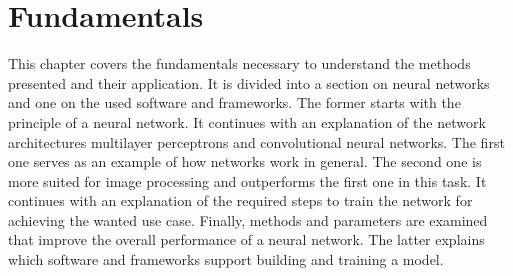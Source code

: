 \chapter{Fundamentals}
\label{sec:fundamentals}
This chapter covers the fundamentals necessary to understand the methods presented and their application.
It is divided into a section on neural networks and one on the used software and frameworks.
The former starts with the principle of a neural network.
It continues with an explanation of the network architectures multilayer perceptrons and convolutional neural networks.
The first one serves as an example of how networks work in general.
The second one is more suited for image processing and outperforms the first one in this task.
It continues with an explanation of the required steps to train the network for achieving the wanted use case.
Finally, methods and parameters are examined that improve the overall performance of a neural network.
The latter explains which software and frameworks support building and training a model.


